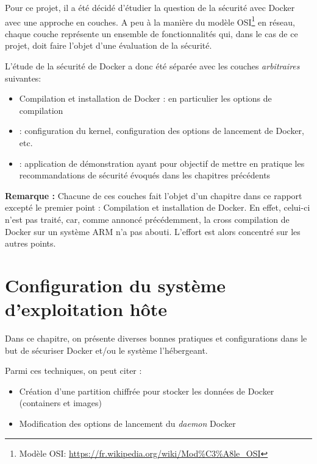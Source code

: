 \documentclass[11pt,a4paper,oneside]{report}
\begin{document}
Pour ce projet, il a été décidé d'étudier la question de la sécurité avec Docker avec une approche en couches. A peu à la manière du modèle OSI\footnote{Modèle OSI: \url{https://fr.wikipedia.org/wiki/Mod\%C3\%A8le_OSI}} en réseau, chaque couche représente un ensemble de fonctionnalités qui, dans le cas de ce projet, doit faire l'objet d'une évaluation de la sécurité.

L'étude de la sécurité de Docker a donc été séparée avec les couches \textit{arbitraires} suivantes:

\begin{itemize}

\item Compilation et installation de Docker : en particulier les options  de compilation

\item {} : configuration du kernel, configuration des options de lancement de Docker, etc.

\item {} : application de démonstration ayant pour objectif de mettre en pratique les recommandations de sécurité évoqués dans les chapitres précédents

\end{itemize}

\textbf{Remarque : } Chacune de ces couches fait l'objet d'un chapitre dans ce rapport excepté le premier point : Compilation et installation de Docker. En effet, celui-ci n'est pas traité, car, comme annoncé précédemment, la cross compilation de Docker sur un système ARM n'a pas abouti. L'effort est alors concentré sur les autres points.


\chapter{Configuration du système d'exploitation hôte}\label{config_systeme_os_hote}
Dans ce chapitre, on présente diverses bonnes pratiques et configurations dans le but de sécuriser Docker et/ou le système l'hébergeant.

Parmi ces techniques, on peut citer :

\begin{itemize}
\item Création d'une partition chiffrée pour stocker les données de Docker (containers et images)
\item Modification des options de lancement du \textit{daemon} Docker
\end{itemize}
\end{document}
